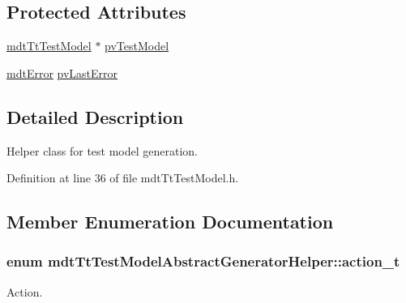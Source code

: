 \subsection*{Protected Attributes}
\begin{DoxyCompactItemize}
\item 
\hyperlink{classmdt_tt_test_model}{mdt\-Tt\-Test\-Model} $\ast$ \hyperlink{classmdt_tt_test_model_abstract_generator_helper_a821fab46c2c201b22f180d4b4b47cd36}{pv\-Test\-Model}
\item 
\hyperlink{classmdt_error}{mdt\-Error} \hyperlink{classmdt_tt_test_model_abstract_generator_helper_a23596c4147cc4ab18d6fb71da6db7a18}{pv\-Last\-Error}
\end{DoxyCompactItemize}


\subsection{Detailed Description}
Helper class for test model generation. 

Definition at line 36 of file mdt\-Tt\-Test\-Model.\-h.



\subsection{Member Enumeration Documentation}
\hypertarget{classmdt_tt_test_model_abstract_generator_helper_abc4f8e08285031633b19282d517cc0b5}{
\subsubsection[{action\-\_\-t}]{\setlength{\rightskip}{0pt plus 5cm}enum {\bf mdt\-Tt\-Test\-Model\-Abstract\-Generator\-Helper\-::action\-\_\-t}}}\label{classmdt_tt_test_model_abstract_generator_helper_abc4f8e08285031633b19282d517cc0b5}


Action. 

